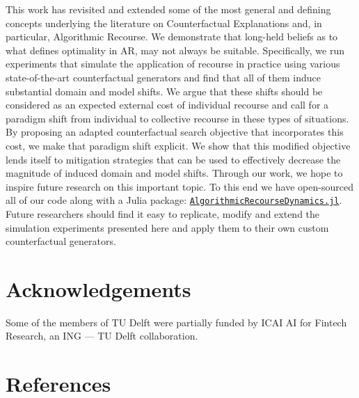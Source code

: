 \documentclass[conference,final,]{IEEEtran}
\theoremstyle{definition}
\theoremstyle{definition}
\theoremstyle{definition}
\theoremstyle{definition}
\theoremstyle{remark}
\begin{document}
This work has revisited and extended some of the most general and defining concepts underlying the literature on Counterfactual Explanations and, in particular, Algorithmic Recourse. We demonstrate that long-held beliefs as to what defines optimality in AR, may not always be suitable. Specifically, we run experiments that simulate the application of recourse in practice using various state-of-the-art counterfactual generators and find that all of them induce substantial domain and model shifts. We argue that these shifts should be considered as an expected external cost of individual recourse and call for a paradigm shift from individual to collective recourse in these types of situations. By proposing an adapted counterfactual search objective that incorporates this cost, we make that paradigm shift explicit. We show that this modified objective lends itself to mitigation strategies that can be used to effectively decrease the magnitude of induced domain and model shifts. Through our work, we hope to inspire future research on this important topic. To this end we have open-sourced all of our code along with a Julia package: \href{https://anonymous.4open.science/r/AlgorithmicRecourseDynamics/README.md}{\texttt{AlgorithmicRecourseDynamics.jl}}. Future researchers should find it easy to replicate, modify and extend the simulation experiments presented here and apply them to their own custom counterfactual generators.

\hypertarget{acknowledgements}{%
\section*{Acknowledgements}\label{acknowledgements}}

Some of the members of TU Delft were partially funded by ICAI AI for Fintech Research, an ING --- TU Delft collaboration.

\hypertarget{references}{%
\section*{References}\label{references}}
\end{document}
